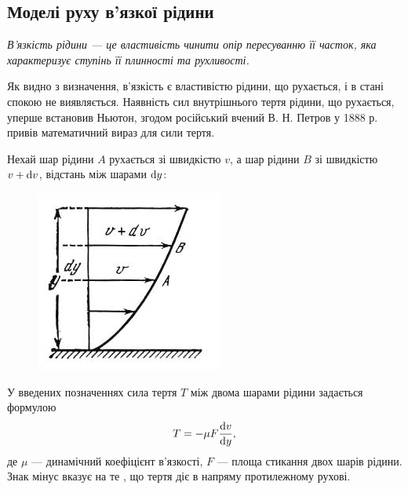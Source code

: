 % 


% 

% 


\setcounter{section}{3}
\setcounter{subsection}{3}
\setcounter{subsubsection}{13}
\setcounter{theorem}{19}
\setcounter{equation}{107}

\subsection{Моделі руху в'язкої рідини}

\begin{definition}
	\it{В'язкість рідини} --- це властивість чинити опір пересуванню її часток, яка характеризує ступінь її плинності та рухливості.
\end{definition}

Як видно з визначення, в'язкість є властивістю рідини, що рухається, і в стані спокою не виявляється. Наявність сил внутрішнього тертя рідини, що рухається, уперше встановив Ньютон, згодом російський вчений В. Н. Петров у 1888 р. привів математичний вираз для сили тертя. \medskip

Нехай шар рідини $A$ рухається зі швидкістю $v$, а шар рідини $B$ зі швидкістю $v + \mathop{}\!\mathrm{d} v$, відстань між шарами $\mathop{}\!\mathrm{d} y$:
\begin{figure}[H]
	\centering
	\includegraphics[]{img/12-1.png}
\end{figure}

У введених позначеннях сила тертя $T$ між двома шарами рідини задається формулою
\begin{equation}
	T = - \mu F\frac{\mathop{}\!\mathrm{d} v}{\mathop{}\!\mathrm{d} y},
\end{equation}
де $\mu$ --- динамічний коефіцієнт в'язкості, $F$ --- площа стикання двох шарів рідини. Знак мінус вказує на те , що тертя діє в напряму протилежному рухові. \medskip

